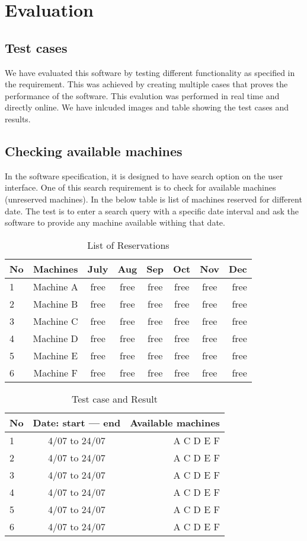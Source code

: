 \chapter{Evaluation}
\label{chap:ch4_abbr}
\section{Test cases}
We have evaluated this software by testing different functionality as specified in the requirement. This was achieved by creating multiple cases that proves the performance of the software. This evalution was performed in real time and directly online. We have inlcuded images and table showing the test cases and results. 
\section*{Checking available machines}
In the software specification, it is designed to have search option on the user interface. One of this search requirement is to check for available machines (unreserved machines). In the below table is list of machines reserved for different date. The test is to enter a search query with a specific date interval and ask the software to provide any machine available withing that date.

\begin{table}[h!]
  \centering
  \label{tab:table1}
  \begin{tabular}{l|c||c||c||c||c||c||r}
    No & Machines & July & Aug & Sep & Oct & Nov & Dec \\
    \hline
    1 &Machine A & free & free & free & free & free & free\\
    2 &Machine B & free & free & free & free & free & free\\
    3 &Machine C & free & free & free & free & free & free\\
    4 &Machine D & free & free & free & free & free & free\\
    5 &Machine E & free & free & free & free & free & free\\
    6 &Machine F & free & free & free & free & free & free\\
  \end{tabular}
  \caption{List of Reservations}
\end{table}

\begin{table}[h!]
  \centering
  \label{tab:table1}
  \begin{tabular}{l|c||r}
    No & Date: start --- end & Available machines\\
    \hline
    1 &4/07 to 24/07  & A C D E F \\
    2 &4/07 to 24/07  & A C D E F \\
    3 &4/07 to 24/07  & A C D E F \\
    4 &4/07 to 24/07  & A C D E F \\
    5 &4/07 to 24/07  & A C D E F \\
    6 &4/07 to 24/07  & A C D E F \\
  \end{tabular}
  \caption{Test case and Result}
\end{table}

